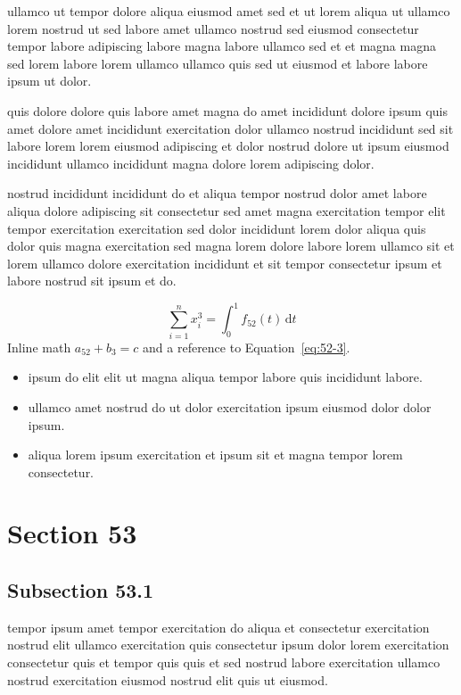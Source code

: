 \documentclass{article}
\begin{document}
ullamco ut tempor dolore aliqua eiusmod amet sed et ut lorem aliqua ut ullamco lorem nostrud ut sed labore amet ullamco nostrud sed eiusmod consectetur tempor labore adipiscing labore magna labore ullamco sed et et magna magna sed lorem labore lorem ullamco ullamco quis sed ut eiusmod et labore labore ipsum ut dolor.

quis dolore dolore quis labore amet magna do amet incididunt dolore ipsum quis amet dolore amet incididunt exercitation dolor ullamco nostrud incididunt sed sit labore lorem lorem eiusmod adipiscing et dolor nostrud dolore ut ipsum eiusmod incididunt ullamco incididunt magna dolore lorem adipiscing dolor.

nostrud incididunt incididunt do et aliqua tempor nostrud dolor amet labore aliqua dolore adipiscing sit consectetur sed amet magna exercitation tempor elit tempor exercitation exercitation sed dolor incididunt lorem dolor aliqua quis dolor quis magna exercitation sed magna lorem dolore labore lorem ullamco sit et lorem ullamco dolore exercitation incididunt et sit tempor consectetur ipsum et labore nostrud sit ipsum et do.

\begin{equation}\label{eq:52-3}
  \sum_{i=1}^{n} x_i^{3} = \int_0^1 f_{52}(t)\,\mathrm{d}t
\end{equation}
Inline math $a_{52} + b_{3} = c$ and a reference to Equation~\eqref{eq:52-3}.

\begin{itemize}
  \item ipsum do elit elit ut magna aliqua tempor labore quis incididunt labore.
  \item ullamco amet nostrud do ut dolor exercitation ipsum eiusmod dolor dolor ipsum.
  \item aliqua lorem ipsum exercitation et ipsum sit et magna tempor lorem consectetur.
\end{itemize}

\section{Section 53}\label{sec:53}
\subsection{Subsection 53.1}\label{sec:53-1}
tempor ipsum amet tempor exercitation do aliqua et consectetur exercitation nostrud elit ullamco exercitation quis consectetur ipsum dolor lorem exercitation consectetur quis et tempor quis quis et sed nostrud labore exercitation ullamco nostrud exercitation eiusmod nostrud elit quis ut eiusmod.
\end{document}
